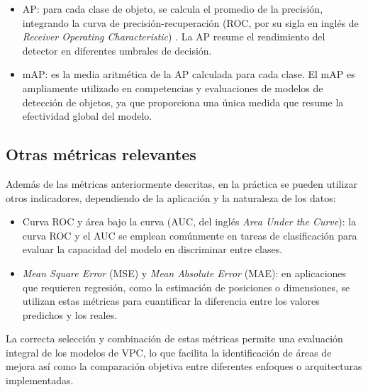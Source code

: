 \begin{itemize}
	\item AP: para cada clase de objeto, se calcula el promedio de la precisión, integrando la curva de precisión-recuperación (ROC, por su sigla en inglés de \textit{Receiver Operating Characteristic}) \citep{wikipedia_curva_2025}. La AP resume el rendimiento del detector en diferentes umbrales de decisión.
	\item mAP: es la media aritmética de la AP calculada para cada clase. El mAP es ampliamente utilizado en competencias y evaluaciones de modelos de detección de objetos, ya que proporciona una única medida que resume la efectividad global del modelo.
\end{itemize}

\subsection{Otras métricas relevantes}

Además de las métricas anteriormente descritas, en la práctica se pueden utilizar otros indicadores, dependiendo de la aplicación y la naturaleza de los datos:
\begin{itemize}
	\item Curva ROC y área bajo la curva (AUC, del inglés \textit{Area Under the Curve}): la curva ROC y el AUC se emplean comúnmente en tareas de clasificación para evaluar la capacidad del modelo en discriminar entre clases.
	\item \textit{Mean Square Error} (MSE) y \textit{Mean Absolute Error} (MAE): en aplicaciones que requieren regresión, como la estimación de posiciones o dimensiones, se utilizan estas métricas para cuantificar la diferencia entre los valores predichos y los reales.
\end{itemize}

La correcta selección y combinación de estas métricas permite una evaluación integral de los modelos de VPC, lo que facilita la identificación de áreas de mejora así como la comparación objetiva entre diferentes enfoques o arquitecturas implementadas.